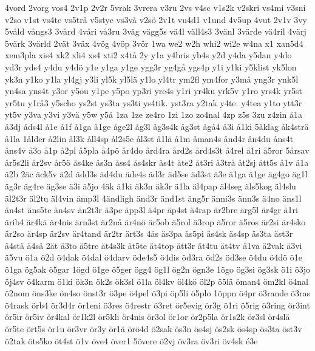 {{4vord
2vorg
vos4
2v1p
2v2r
5vrak
3vrera
v3ru
2vs
v4sc
v1s2k
v2skri
vs4mi
v3sni
v2so
v1st
vs4te
vs5tr^^e5
v5styc
vs3v^^e5
v2s^^f6
2v1t
vu4d1
v1und
4v5up
4vut
2v1v
3vy
5v^^e5ld
v^^e5ngs3
3v^^e5rd
4v^^e5ri
v^^e53ru
3v^^e4g
v^^e4gg5s
v^^e44l
v^^e4ll4s3
3v^^e4nl
3v^^e4rde
v^^e44ril
4v^^e4rj
5v^^e4rk
3v^^e4rld
2v^^e4t
3v^^e4x
4v^^f6g
4v^^f6p
3v^^f6r
1wa
we2
w2h
whi2
wi2e
w4na
x1
xan5d4
xem3pla
xis4
xk2
xli4
xs4
xti2
x4t^^e5
2y
y1a
y4bris
yb4s
y2d
y4da
y5dan
y4do
yd3r
yds4
y4du
y4d^^f6
y1e
y1ga
y1ge
ygg3r
yg4g^^e5
ygs4p
y1i
y1ki
y5klist
yk5lon
yk3n
y1ko
y1la
yl4gj
y3li
yl5k
yl5l^^e4
y1lo
yl4tr
ym2fl
ym4for
y3m^^e5
yng3r
ynk5l
yn4sa
yns4t
y3or
y5ou
y1pe
y5po
yp3ri
yre4s
y1ri
yr4ku
yrk5v
y1ro
yrs4k
yr5st
yr5tu
y1r^^e53
y5scho
ys2st
ys3ta
ys3ti
ys4tik.
yst3ra
y2tak
y4te.
y4tea
y1to
ytt3r
yt5v
y3va
y3vi
y3v^^e4
y5w
y5^^e5
1za
1ze
ze4ro
1zi
1zo
zo4nal
4zp
z5s
3zu
z4zin
^^e51a
^^e53dj
^^e5ds4l
^^e51e
^^e51f
^^e51ga
^^e51ge
^^e5ge2l
^^e5g3l
^^e5g3s4k
^^e5g3st
^^e5g^^e54
^^e53i
^^e51ki
5^^e5klag
^^e5k4str^^e4
^^e51la
1^^e5lder
^^e52lin
^^e5l3k
^^e5ll4sp
^^e5l2s5e
^^e5l3st
^^e51l^^e4
^^e51m
^^e5man4s
^^e5nd4r
^^e5n4du
^^e5ns4t
^^e5ns4v
^^e53o
^^e51p
^^e52pl
^^e55pla
^^e54p^^f6
^^e5r4do
^^e5rd4ra
^^e5rd2s
^^e5rd4s3t
^^e54rel
^^e51ri
^^e55ror
5^^e5rsav
^^e5r5s2li
^^e5r2sv
^^e5r5^^f6
^^e5s4ke
^^e5s3n
^^e5ss4
^^e5s4skr
^^e5s4t
^^e5te2
^^e5t3ri
^^e53tr^^e5
^^e5t2sj
^^e5tt5s
^^e51v
^^e41a
^^e42b
2^^e4c
^^e4ck5v
^^e42d
^^e4dd3s
^^e4d4du
^^e4de4s
^^e4d3r
^^e4d5se
^^e4d3st
^^e43e
^^e41ga
^^e41ge
^^e4g4go
^^e4g1l
^^e4g3r
^^e4g4re
^^e4g3se
^^e43i
^^e45jo
4^^e4k
^^e41ki
^^e4k3n
^^e4k3r
^^e41la
^^e4l4pap
^^e4l4seg
^^e4ls5kog
^^e4l4slu
^^e4l2t3r
^^e4l2tu
^^e4l4vin
^^e4mp3l
4^^e4ndligh
^^e4nd3r
^^e4nd1st
^^e4ng5r
^^e4nni3s
^^e4nn3s
^^e44no
^^e4ns1l
^^e4n4st
^^e4ns5te
^^e4n4sv
^^e4n2t3r
^^e43pe
^^e4pp3l
^^e44pr
^^e4p4st
^^e44rap
^^e4r2bre
^^e4rg5l
^^e4r4gr
^^e41ri
^^e4rib4
^^e4r4k^^e4
^^e4r4nis
^^e4rn3st
^^e4r2n^^e5
^^e4r4n^^f6
^^e4r5ob
^^e45rol
^^e43rop
^^e45ror
^^e45ros
^^e4r2si
^^e4r4sko
^^e4r2so
^^e4r4sp
^^e4r2sv
^^e4r4tand
^^e4r2tr
^^e4rt3s
4^^e4s
^^e4s3pa
^^e4s5pi
^^e4s4sk
^^e4s4sp
^^e4s3ta
^^e4st3r
^^e44st^^e4
^^e44s^^e5
2^^e4t
^^e43to
^^e45tre
^^e4t4s3k
^^e4t5te
^^e4t4top
^^e4tt3r
^^e4t4tu
^^e4t4tv
^^e41va
^^e42vak
^^e43vi
^^e45vu
^^f61a
^^f62d
^^f64dak
^^f64dal
^^f64darv
^^f6de4s5
^^f64dis
^^f6d3ra
^^f6d2s
^^f6d3se
^^f64du
^^f64d^^f6
^^f61e
^^f61ga
^^f6g5ak
^^f65gar
1^^f6gd
^^f61ge
^^f65ger
^^f6gg4
^^f6g1l
^^f6g2n
^^f6gn3e
1^^f6go
^^f6g3si
^^f6g3sk
^^f61i
^^f63jo
^^f6j4sv
^^f64karm
^^f61ki
^^f6k3n
^^f6k2s
^^f6k3sl
^^f61la
^^f6l4kv
^^f6l4k^^f6
^^f6l2p
^^f65l^^e4
^^f6man4
^^f6m2kl
^^f64nal
^^f62nom
^^f6ns3ke
^^f6n4so
^^f6nst3r
^^f63pe
^^f64pel
^^f63pi
^^f6p5li
^^f65plo
1^^f6ppn
^^f64pr
^^f63rande
^^f63ras
^^f64rask
^^f6rb4
^^f6r3d4r
^^f6r1eni
^^f63res
^^f64restr
^^f63ret
^^f6r5evig
^^f6r3g
^^f61ri
^^f65rig
^^f63ring
^^f6r3int
^^f6r5ir
^^f6r5iv
^^f6r4kal
^^f6r1k2l
^^f6r5kli
^^f6r4nis
^^f6r3ol
^^f6r1or
^^f6r2p5la
^^f6r1s2k
^^f6r3sl
^^f6r4sl^^e4
^^f6r5te
^^f6rt5s
^^f6r1u
^^f6r3vr
^^f6r3y
^^f6r1^^e4
^^f6r^^f64d
^^f62sak
^^f6s3n
^^f6s4sj
^^f6s2sk
^^f6s4sp
^^f6s3ta
^^f6st3v
^^f62tak
^^f6ts5ko
^^f6t4st
^^f61v
^^f6ve4
^^f6ver1
5^^f6vere
^^f62vj
^^f6v3ra
^^f6v3ri
^^f6v4sk
^^e93e
}
}

